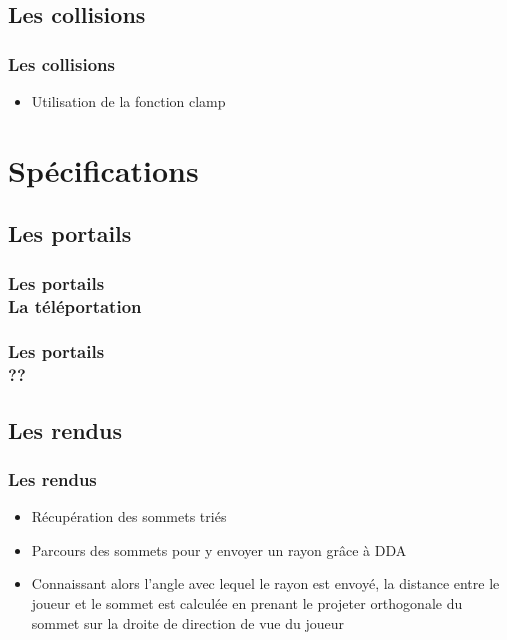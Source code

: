 \documentclass{beamer}
\begin{document}
\subsection{Les collisions}

\begin{frame}
    \frametitle{Les collisions}
    \begin{block}{}
        \begin{itemize}
            \item Utilisation de la fonction clamp
        \end{itemize}
    \end{block}
\end{frame}

\section{Spécifications}
\subsection{Les portails}

\begin{frame}
    \frametitle{Les portails \\
                \small La téléportation}
    \begin{block}{}
        
    \end{block}
\end{frame}

\begin{frame}
    \frametitle{Les portails \\
                \small ??}
    \begin{block}{}
        
    \end{block}
\end{frame}

\subsection{Les rendus}

\begin{frame}
    \frametitle{Les rendus}
    \begin{block}{}
        \begin{itemize}
            \item Récupération des sommets triés
            \item Parcours des sommets pour y envoyer un rayon grâce à DDA
            \item Connaissant alors l'angle avec lequel le rayon est envoyé, la distance
            entre le joueur et le sommet est calculée en prenant le projeter orthogonale
            du sommet sur la droite de direction de vue du joueur 
        \end{itemize}
    \end{block}
\end{frame}
\end{document}
